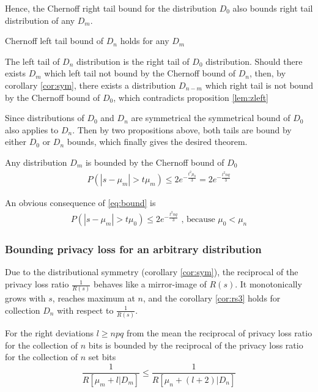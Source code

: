 \documentclass[11pt]{article}
\begin{document}
\begin{prop}
\begin{pf}
 Hence,  the Chernoff right tail bound for the distribution $D_0$ also bounds right tail distribution of any $D_m$.
\end{pf}
\end{prop}

\begin{prop} \label{lem:zright}
Chernoff left tail bound of $D_n$ holds for any $D_m$
\begin{pf}
 The left tail of $D_n$ distribution is the right tail of $D_0$ distribution.  Should there exists $D_m$ which left tail not bound by the Chernoff bound of $D_n$, then, by corollary \ref{cor:sym},  there exists a distribution $D_{n-m}$ which right tail is not bound by the Chernoff bound of $D_0$, which contradicts proposition \ref{lem:zleft}
\end{pf}
\end{prop}

Since distributions of $D_0$ and $D_n$ are symmetrical the symmetrical bound of $D_0$ also applies to $D_n$.  Then by two propositions above, both tails are bound by either $D_0$ or $D_n$ bounds, which finally gives the desired theorem. 

\begin{prop} \label{lem:bound}
Any distribution $D_m$ is bounded by the Chernoff bound of $D_0$
 \begin{align}
P(|s - \mu_m| > t\mu_m) \le 2 e^{- \frac{t^2\mu_0}{3}}  = 2 e^{- \frac{t^2nq}{3}} \label{eq:bound}
\end{align}
\end{prop}

An obvious consequence of \ref{eq:bound} is  
\begin{align}
P(|s - \mu_m| > t\mu_0) \le  2 e^{- \frac{t^2nq}{3}} \text{ , because } \mu_0 < \mu_n \label{eq:zbound}
\end{align} 


\subsubsection{Bounding privacy loss for an arbitrary distribution}

Due to the distributional symmetry (corollary \ref{cor:sym}), the reciprocal of the privacy loss ratio $\frac{1}{R(s)}$ behaves like a mirror-image of $R(s)$.  It monotonically grows with $s$, reaches maximum at $n$, and the corollary \ref{cor:rs3} holds for collection $D_n$ with respect to $\frac{1}{R(s)}$.  
\begin{cor} \label{cor:rtail}
For the right deviations $l \ge npq$ from the mean the reciprocal of privacy loss ratio for the collection of $n$ bits is bounded by the reciprocal of the privacy loss ratio for the collection of $n$ set bits
\[ \frac{1}{R[\mu_m + l|D_m]} \le \frac{1}{R[\mu_n + (l+2)|D_n]} \]
\end{cor}
\end{document}
